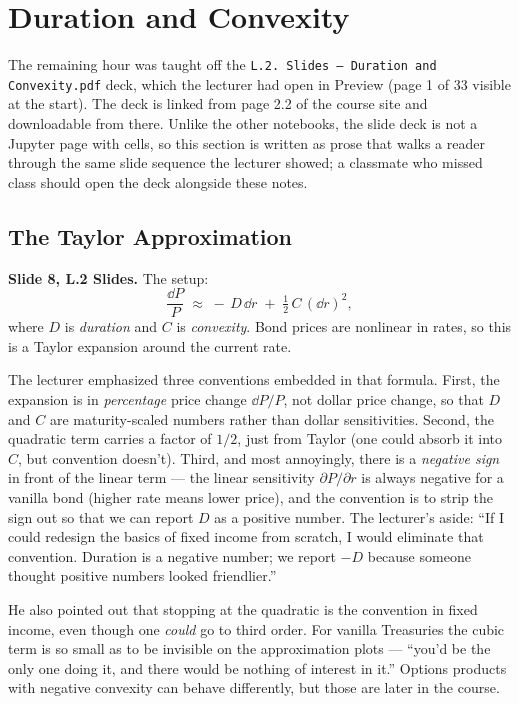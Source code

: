 \section{Duration and Convexity}\label{L2-sec:duration}

The remaining hour was taught off the \texttt{L.2.~Slides --- Duration and
Convexity.pdf} deck, which the lecturer had open in Preview (page 1 of 33
visible at the start). The deck is linked from page 2.2 of the course site
and downloadable from there. Unlike the other notebooks, the slide deck is
not a Jupyter page with cells, so this section is written as prose that
walks a reader through the same slide sequence the lecturer showed; a
classmate who missed class should open the deck alongside these notes.

\subsection{The Taylor Approximation}\label{L2-sec:taylor}

\textbf{Slide 8, L.2 Slides.} The setup:
\[
  \frac{\dd P}{P} \;\approx\; -\,D\,\dd r \;+\; \tfrac{1}{2}\,C\,(\dd r)^2,
\]
where $D$ is \emph{duration} and $C$ is \emph{convexity}. Bond prices are
nonlinear in rates, so this is a Taylor expansion around the current rate.

The lecturer emphasized three conventions embedded in that formula. First,
the expansion is in \emph{percentage} price change $\dd P/P$, not dollar price
change, so that $D$ and $C$ are maturity-scaled numbers rather than dollar
sensitivities. Second, the quadratic term carries a factor of $1/2$, just
from Taylor (one could absorb it into $C$, but convention doesn't). Third,
and most annoyingly, there is a \emph{negative sign} in front of the linear
term --- the linear sensitivity $\partial P/\partial r$ is always negative for a
vanilla bond (higher rate means lower price), and the convention is to
strip the sign out so that we can report $D$ as a positive number. The
lecturer's aside: ``If I could redesign the basics of fixed income from
scratch, I would eliminate that convention. Duration is a negative number; we
report $-D$ because someone thought positive numbers looked friendlier.''

He also pointed out that stopping at the quadratic is the convention in
fixed income, even though one \emph{could} go to third order. For vanilla
Treasuries the cubic term is so small as to be invisible on the
approximation plots --- ``you'd be the only one doing it, and there would be
nothing of interest in it.'' Options products with negative convexity can
behave differently, but those are later in the course.

